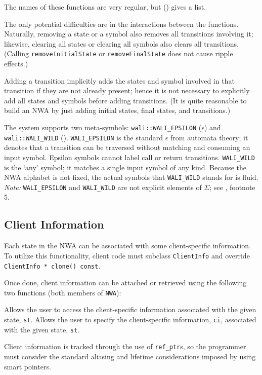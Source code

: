 The names of these functions are very regular, but
 () gives a list.

The only potential difficulties are in the interactions between the
functions. Naturally, removing a state or a symbol also removes all
transitions involving it; likewise, clearing all states or clearing all symbols
also clears all transitions. (Calling \texttt{removeInitialState} or \texttt{removeFinalState}
does not cause ripple effects.)

Adding a transition implicitly adds the states and symbol involved in that
transition if they are not already present; hence it is not necessary to
explicitly add all states and symbols before adding transitions. (It is quite
reasonable to build an NWA by just adding initial states, final states, and
transitions.)


The system supports two meta-symbols: \texttt{wali::WALI\_EPSILON}
(\texttt{$\epsilon$}) and \texttt{wali::WALI\_WILD} (\texttt{\wild}).
\texttt{WALI\_EPSILON} is the standard $\epsilon$ from automata theory; it
denotes that a transition can be traversed without matching
and consuming an input symbol.  Epsilon symbols cannot label call or return
transitions. \texttt{WALI\_WILD} is the `any' symbol; it matches a single input
symbol of any kind.  Because the NWA alphabet is not fixed, the actual symbols
that \texttt{WALI\_WILD} stands for is fluid.  \textsl{Note:}
\texttt{WALI\_EPSILON} and \texttt{WALI\_WILD} are not explicit
elements of $\Sigma$; see , footnote 5.



\subsection{Client Information}
\label{Se:client-info}

Each state in the NWA can be associated with some client-specific
information. To utilize this functionality, client code must subclass
\texttt{ClientInfo} and override \texttt{ClientInfo * clone() const}.

Once done, client information can be attached or retrieved using the
following two functions (both members of \texttt{NWA}):
\begin{functionlist}
    Allows the user to access the client-specific information associated with
    the given state, \texttt{st}.
    Allows the user to specify the client-specific information, \texttt{ci},
    associated with the given state, \texttt{st}. \\
\end{functionlist}
Client information is tracked through the use of \texttt{ref\_ptr}s, so the
programmer must consider the standard aliasing and lifetime considerations
imposed by using smart pointers.

